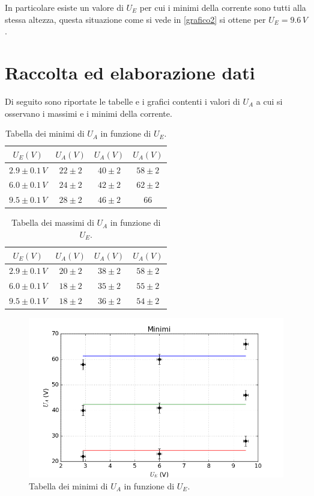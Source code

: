 \documentclass[10pt,a4paper]{article}
\begin{document}
In particolare esiste un valore di $U_E$ per cui i minimi della corrente sono tutti alla stessa altezza, questa situazione come si vede in \ref{grafico2} si ottene per $U_E = 9.6 \, V$.\\

\section{Raccolta ed elaborazione dati}

Di seguito sono riportate le tabelle e i grafici contenti i valori di $U_A$ a cui si osservano i massimi e i minimi della corrente.\\


\begin{table}[!htb]
\centering
\begin{tabular}{|c|c|c|c|}
\hline 
$U_E (V)$ & $U_A (V)$ & $U_A (V)$ & $U_A (V)$ \\ 
\hline 
$2.9\pm0.1\,V$ & $22\pm2$ & $40\pm2$ & $58\pm2$ \\ 
\hline 
$6.0\pm0.1\,V$ & $24\pm2$ & $42\pm2$ & $62\pm2$ \\ 
\hline 
$9.5\pm0.1\,V$ & $28\pm2$ & $46\pm2$ & $66$ \\ 
\hline 
\end{tabular}
\caption{Tabella dei minimi di $U_A$ in funzione di $U_E$.}
\label{tabellaMinimi} 
\end{table}


\begin{table}[!htb]
\centering
\begin{tabular}{|c|c|c|c|}
\hline 
$U_E (V)$ & $U_A (V)$ & $U_A (V)$ & $U_A (V)$ \\ 
\hline 
$2.9\pm0.1\,V$ & $20\pm2$ & $38\pm2$ & $58\pm2$ \\ 
\hline 
$6.0\pm0.1\,V$ & $18\pm2$ & $35\pm2$ & $55\pm2$ \\ 
\hline 
$9.5\pm0.1\,V$ & $18\pm2$ & $36\pm2$ & $54\pm2$ \\ 
\hline 
\end{tabular} 
\caption{Tabella dei massimi di $U_A$ in funzione di $U_E$.}
\label{tabellaMassimi}
\end{table}

\begin{figure}[!htb]
  \centering
  \includegraphics[scale=.7]{min.png}
\caption{Tabella dei minimi di $U_A$ in funzione di $U_E$.}
\label{graficoMin}
\end{figure}
\end{document}
